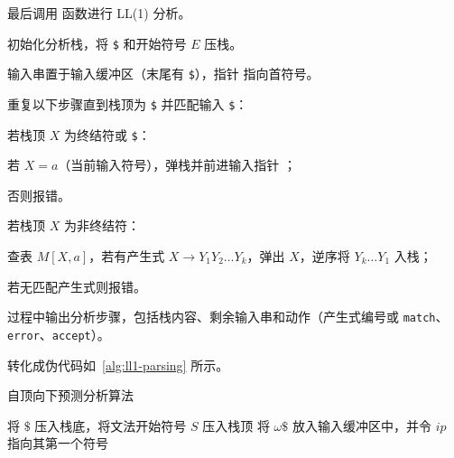 最后调用  函数进行 LL(1) 分析。\begin{compactitem}
    \item 初始化分析栈，将 \verb|$| 和开始符号 $E$ 压栈。
    \item 输入串置于输入缓冲区（末尾有 \verb|$|），指针  指向首符号。
    \item 重复以下步骤直到栈顶为 \verb|$| 并匹配输入 \verb|$|：\begin{compactenum}
              \item 若栈顶 $X$ 为终结符或 \verb|$|：\begin{compactitem}
                        \item 若 $X = a$（当前输入符号），弹栈并前进输入指针 ；
                        \item 否则报错。
                    \end{compactitem}
              \item 若栈顶 $X$ 为非终结符：\begin{compactitem}
                        \item 查表 $M[X, a]$，若有产生式 $X \to Y_1 Y_2 \dots Y_k$，弹出 $X$，逆序将 $Y_k \dots Y_1$ 入栈；
                        \item 若无匹配产生式则报错。
                        \item 过程中输出分析步骤，包括栈内容、剩余输入串和动作（产生式编号或 \texttt{match}、\texttt{error}、\texttt{accept}）。
                    \end{compactitem}
          \end{compactenum}
\end{compactitem}

转化成伪代码如~\autoref{alg:ll1-parsing} 所示。
\begin{algorithm}[htbp]
    \caption{自顶向下预测分析算法}
    \label{alg:ll1-parsing}

    将 $\$ $ 压入栈底，将文法开始符号 $S$ 压入栈顶\;
        将 $\omega\$ $ 放入输入缓冲区中，并令 $ip$ 指向其第一个符号\;

\end{algorithm}

